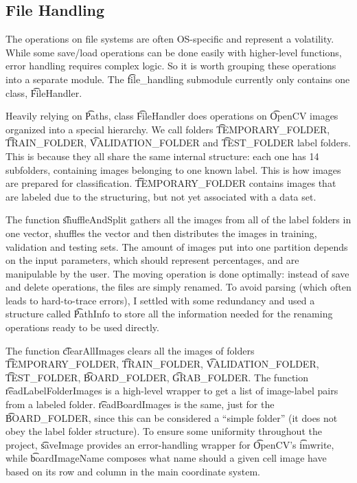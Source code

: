 
\subsection{File Handling}

The operations on file systems are often OS-specific and represent a volatility. While some save/load operations can be done easily with higher-level functions, error handling requires complex logic. So it is worth grouping these operations into a separate module. The \t{file\_handling} submodule currently only contains one class, \t{FileHandler}.

Heavily relying on \t{Paths}, class \t{FileHandler} does operations on \t{OpenCV} images organized into a special hierarchy. We call folders \t{TEMPORARY\_FOLDER}, \t{TRAIN\_FOLDER}, \t{VALIDATION\_FOLDER} and \t{TEST\_FOLDER} label folders. This is because they all share the same internal structure: each one has 14 subfolders, containing images belonging to one known label. This is how images are prepared for classification. \t{TEMPORARY\_FOLDER} contains images that are labeled due to the structuring, but not yet associated with a data set.

The function \t{shuffleAndSplit} gathers all the images from all of the label folders in one vector, shuffles the vector and then distributes the images in training, validation and testing sets. The amount of images put into one partition depends on the input parameters, which should represent percentages, and are manipulable by the user. The moving operation is done optimally: instead of save and delete operations, the files are simply renamed. To avoid parsing (which often leads to hard-to-trace errors), I settled with some redundancy and used a structure called \t{PathInfo} to store all the information needed for the renaming operations ready to be used directly.

The function \t{clearAllImages} clears all the images of folders \t{TEMPORARY\_FOLDER}, \t{TRAIN\_FOLDER}, \t{VALIDATION\_FOLDER}, \t{TEST\_FOLDER}, \t{BOARD\_FOLDER}, \t{GRAB\_FOLDER}. The function \t{readLabelFolderImages} is a high-level wrapper to get a list of image-label pairs from a labeled folder. \t{readBoardImages} is the same, just for the \t{BOARD\_FOLDER}, since this can be considered a ``simple folder'' (it does not obey the label folder structure). To ensure some uniformity throughout the project, \t{saveImage} provides an error-handling wrapper for \t{OpenCV}'s \t{imwrite}, while \t{boardImageName} composes what name should a given cell image have based on its row and column in the main coordinate system.



